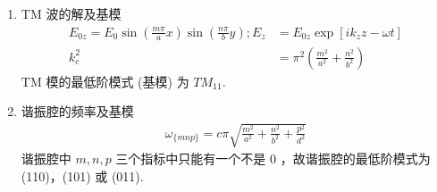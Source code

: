 \documentclass[../../note.tex]{subfiles}
\begin{document}
\begin{enumerate}
	\item TM 波的解及基模
	\begin{align}
		E_{0 z}=E_0 \sin \left(\frac{m \pi}{a} x\right) \sin \left(\frac{n \pi}{b} y\right) ; E_z & =E_{0 z} \exp \left[i k_z z-\omega t\right] \\
		k_c^2 & =\pi^2\left(\frac{m^2}{a^2}+\frac{n^2}{b^2}\right)
	\end{align}
	$\mathrm{TM}$ 模的最低阶模式 (基模) 为 $T M_{11}$.
	\item 谐振腔的频率及基模
	\begin{align}
	\omega_{\{m n p\}}=c \pi \sqrt{\frac{m^2}{a^2}+\frac{n^2}{b^2}+\frac{p^2}{d^2}}
\end{align}
	谐振腔中 $m, n, p$ 三个指标中只能有一个不是 0 ，故谐振腔的最低阶模式为 (110)，(101) 或 (011).
\end{enumerate}
\end{document}
